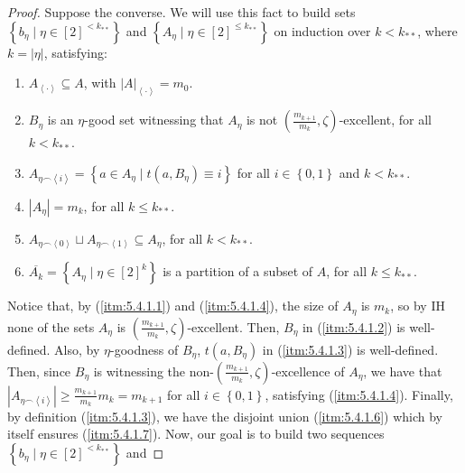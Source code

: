         \begin{proof}
            Suppose the converse.
            We will use this fact to build sets $\left\{ b_\eta \mid \eta \in [2]^{<k_{**}} \right\}$ and
            $\left\{ A_\eta \mid \eta \in [2]^{\leq k_{**}} \right\}$ on induction over $k<k_{**}$, where $k = |\eta|$,
            satisfying:
            \begin{enumerate}
                \item\label{itm:5.4.1.1} $A_{\left< \cdot \right>} \subseteq A$, with $|A|_{\left< \cdot \right>} = m_0$.
                \item\label{itm:5.4.1.2} $B_\eta$ is an $\eta$-good set witnessing that $A_\eta$ is not
                    $\left(\frac{m_{k+1}}{m_{k}}, \zeta\right)$-excellent, for all $k < k_{**}$.
                \item\label{itm:5.4.1.3} $A_{\eta \frown \left< i \right>} = \left\{ a \in A_\eta \mid t(a, B_\eta) \equiv i \right\}$
                    for all $i \in \left\{ 0,1 \right\}$ and $k < k_{**}$.
                \item\label{itm:5.4.1.4} $|A_{\eta}| = m_k$, for all $k \leq k_{**}$.
                \item\label{itm:5.4.1.6} $A_{\eta \frown \left< 0 \right>} \sqcup A_{\eta \frown \left< 1 \right>} \subseteq A_\eta$,
                    for all $k < k_{**}$.
                \item\label{itm:5.4.1.7} $\overline{A_k} = \left\{ A_\eta \mid \eta \in [2]^k \right\}$ is a partition of
                    a subset of $A$, for all $k \leq k_{**}$.
            \end{enumerate}
            Notice that, by (\ref{itm:5.4.1.1}) and (\ref{itm:5.4.1.4}), the size of $A_\eta$ is $m_k$,
            so by IH none of the sets $A_\eta$ is $\left(\frac{m_{k+1}}{m_{k}}, \zeta\right)$-excellent.
            Then, $B_\eta$ in (\ref{itm:5.4.1.2}) is well-defined.
            Also, by $\eta$-goodness of $B_\eta$, $t(a, B_\eta)$ in (\ref{itm:5.4.1.3}) is well-defined.
            Then, since $B_\eta$ is witnessing the non-$\left(\frac{m_{k+1}}{m_{k}}, \zeta\right)$-excellence of $A_\eta$,
            we have that $|A_{\eta \frown \left< i \right>}| \geq \frac{m_{k+1}}{m_k} m_{k} = m_{k+1}$ for all
            $i \in \left\{ 0,1 \right\}$, satisfying (\ref{itm:5.4.1.4}).
            Finally, by definition (\ref{itm:5.4.1.3}), we have the disjoint union (\ref{itm:5.4.1.6}) which by itself
            ensures (\ref{itm:5.4.1.7}).
            Now, our goal is to build two sequences $\left\{ b_\eta \mid \eta \in [2]^{<k_{**}} \right\}$ and

\end{proof}
